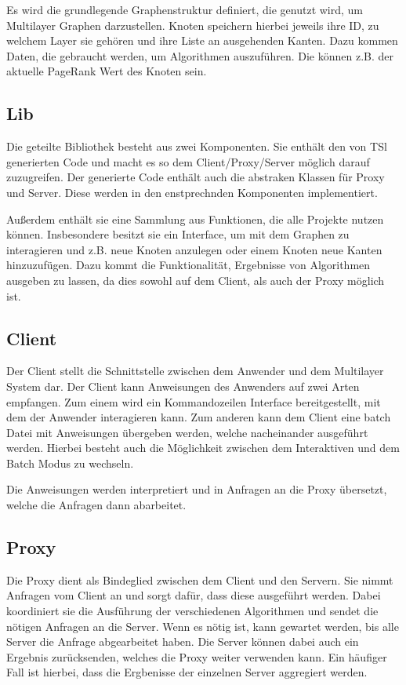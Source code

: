 Es wird die grundlegende Graphenstruktur definiert, die genutzt wird, um Multilayer Graphen darzustellen. Knoten speichern hierbei jeweils ihre ID, zu welchem Layer sie gehören
und ihre Liste an ausgehenden Kanten. Dazu kommen Daten, die gebraucht werden, um Algorithmen auszuführen. Die können z.B. der aktuelle PageRank Wert des Knoten sein.


\subsection{Lib}

Die geteilte Bibliothek besteht aus zwei Komponenten. Sie enthält den von TSl generierten Code und macht es so dem Client/Proxy/Server möglich darauf zuzugreifen. Der generierte Code enthält auch die abstraken Klassen für Proxy und Server. Diese werden in den enstprechnden Komponenten implementiert. 

Außerdem enthält sie eine Sammlung aus Funktionen, die alle Projekte nutzen können. Insbesondere besitzt sie ein Interface, um mit dem Graphen zu interagieren und z.B. neue Knoten anzulegen oder einem Knoten neue Kanten hinzuzufügen.
Dazu kommt die Funktionalität, Ergebnisse von Algorithmen ausgeben zu lassen, da dies sowohl auf dem Client, als auch der Proxy möglich ist.


\subsection{Client}

Der Client stellt die Schnittstelle zwischen dem Anwender und dem Multilayer System dar. Der Client kann Anweisungen des Anwenders auf zwei Arten empfangen.
Zum einem wird ein Kommandozeilen Interface bereitgestellt, mit dem der Anwender interagieren kann. Zum anderen kann dem Client eine batch Datei mit Anweisungen übergeben werden,
welche nacheinander ausgeführt werden.
Hierbei besteht auch die Möglichkeit zwischen dem Interaktiven und dem Batch Modus zu wechseln.

Die Anweisungen werden interpretiert und in Anfragen an die Proxy übersetzt, welche die Anfragen dann abarbeitet.

\subsection{Proxy}

Die Proxy dient als Bindeglied zwischen dem Client und den Servern. Sie nimmt Anfragen vom Client an und sorgt dafür, dass diese ausgeführt werden.
Dabei koordiniert sie die Ausführung der verschiedenen Algorithmen und sendet die nötigen Anfragen an die Server. Wenn es nötig ist, kann gewartet werden,
bis alle Server die Anfrage abgearbeitet haben. Die Server können dabei auch ein Ergebnis zurücksenden, welches die Proxy weiter verwenden kann. Ein häufiger Fall
ist hierbei, dass die Ergbenisse der einzelnen Server aggregiert werden.


